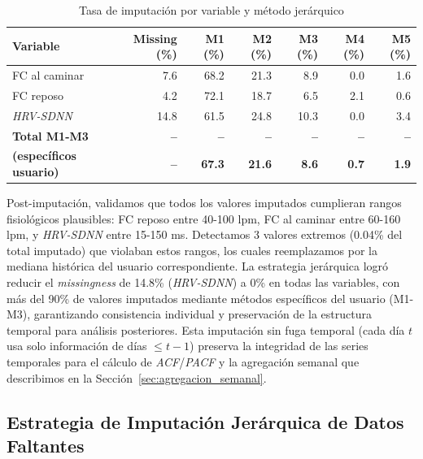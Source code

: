 \begin{table}[H]
    \centering
    \caption{Tasa de imputación por variable y método jerárquico}
    \label{tab:imputation_rates}
    \small
    \begin{tabular}{@{}lrrrrrr@{}}
        \toprule
        \textbf{Variable} & \textbf{Missing (\%)} & \textbf{M1 (\%)} & \textbf{M2 (\%)} & \textbf{M3 (\%)} & \textbf{M4 (\%)} & \textbf{M5 (\%)} \\
        \midrule
        FC al caminar   & 7.6 & 68.2 & 21.3 & 8.9  & 0.0 & 1.6 \\
        FC reposo    & 4.2 & 72.1 & 18.7 & 6.5  & 2.1 & 0.6 \\
        \textit{HRV-SDNN}     & 14.8 & 61.5 & 24.8 & 10.3 & 0.0 & 3.4 \\
        \midrule
        \textbf{Total M1-M3} & \textbf{--} & \textbf{--} & \textbf{--} & \textbf{--} & \textbf{--} & \textbf{--} \\
        \textbf{(específicos usuario)} & \textbf{--} & \textbf{67.3} & \textbf{21.6} & \textbf{8.6} & \textbf{0.7} & \textbf{1.9} \\
        \bottomrule
    \end{tabular}
\end{table}

\FloatBarrier

Post-imputación, validamos que todos los valores imputados cumplieran rangos fisiológicos plausibles: FC reposo entre 40-100 lpm, FC al caminar entre 60-160 lpm, y \textit{HRV-SDNN} entre 15-150 ms. Detectamos 3 valores extremos (0.04\% del total imputado) que violaban estos rangos, los cuales reemplazamos por la mediana histórica del usuario correspondiente. La estrategia jerárquica logró reducir el \textit{missingness} de 14.8\% (\textit{HRV-SDNN}) a 0\% en todas las variables, con más del 90\% de valores imputados mediante métodos específicos del usuario (M1-M3), garantizando consistencia individual y preservación de la estructura temporal para análisis posteriores. Esta imputación sin fuga temporal (cada día $t$ usa solo información de días $\leq t-1$) preserva la integridad de las series temporales para el cálculo de \textit{ACF}/\textit{PACF} y la agregación semanal que describimos en la Sección~\ref{sec:agregacion_semanal}.

\subsection{Estrategia de Imputación Jerárquica de Datos Faltantes}
\label{subsec:estrategia_imputacion}


